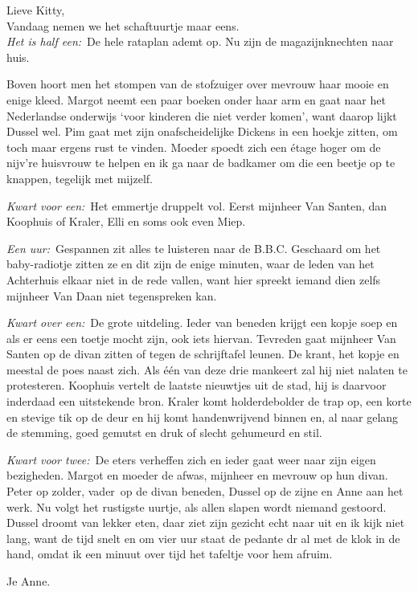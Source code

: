 \documentclass{book}
\begin{document}
Lieve Kitty,\\
Vandaag nemen we het schaftuurtje maar eens.\\
\emph{Het is half
een:}~De hele rataplan ademt op. Nu zijn de magazijnknechten naar huis.

Boven hoort men het stompen van de stofzuiger over mevrouw haar mooie en enige
kleed. Margot neemt een paar boeken onder haar arm en gaat naar het Nederlandse
onderwijs `voor kinderen die niet verder komen', want daarop lijkt Dussel wel.
Pim gaat met zijn onafscheidelijke Dickens in een hoekje zitten, om toch maar
ergens rust te vinden. Moeder spoedt zich een étage hoger om de nijv're
huisvrouw te helpen en ik ga naar de badkamer om die een beetje op te knappen,
tegelijk met mijzelf.

\emph{Kwart voor een:}~Het emmertje druppelt vol. Eerst mijnheer Van Santen, dan
Koophuis of Kraler, Elli en soms ook even Miep.

\emph{Een uur:}~Gespannen zit alles te luisteren naar de B.B.C.  Geschaard om
het baby-radiotje zitten ze en dit zijn de enige minuten, waar de leden van het
Achterhuis elkaar niet in de rede vallen, want hier spreekt iemand dien zelfs
mijnheer Van Daan niet tegenspreken kan.

\emph{Kwart over een:}~De grote uitdeling. Ieder van beneden krijgt een kopje
soep en als er eens een toetje mocht zijn, ook iets hiervan.  Tevreden gaat
mijnheer Van Santen op de divan zitten of tegen de schrijftafel leunen. De
krant, het kopje en meestal de poes naast zich.  Als één van deze drie mankeert
zal hij niet nalaten te protesteren.  Koophuis vertelt de laatste nieuwtjes uit
de stad, hij is daarvoor inderdaad een uitstekende bron. Kraler komt
holderdebolder de trap op, een korte en stevige tik op de deur en hij komt
handenwrijvend binnen en, al naar gelang de stemming, goed gemutst en druk of
slecht gehumeurd en stil.

\emph{Kwart voor twee:}~De eters verheffen zich en ieder gaat weer naar zijn
eigen bezigheden. Margot en moeder de afwas, mijnheer en mevrouw op hun divan.
Peter op zolder, vader~op de divan beneden, Dussel op de zijne en Anne aan het
werk. Nu volgt het rustigste uurtje, als allen slapen wordt niemand gestoord.
Dussel droomt van lekker eten, daar ziet zijn gezicht echt naar uit en ik kijk
niet lang, want de tijd snelt en om vier uur staat de pedante dr al met de klok
in de hand, omdat ik een minuut over tijd het tafeltje voor hem afruim.

Je Anne.
\end{document}
